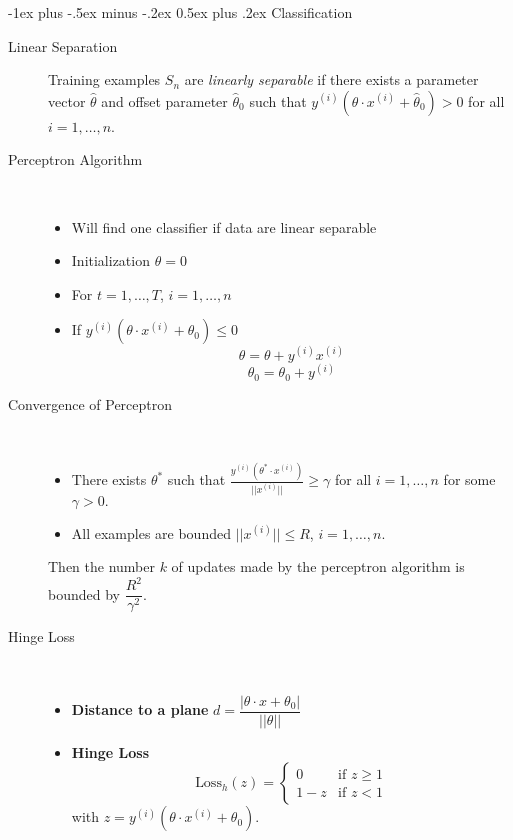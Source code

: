 \documentclass[a4paper, 10pt,landscape]{article}
\makeatletter
\renewcommand{\section}{\@startsection{section}{1}{0mm}%
                                {-1ex plus -.5ex minus -.2ex}%
                                {0.5ex plus .2ex}%
                                {\normalfont\large\bfseries}}
\makeatother
\begin{document}
\raggedright
\footnotesize
\begin{multicols*}{3}

\setlength{\premulticols}{1pt}
\setlength{\postmulticols}{1pt}
\setlength{\multicolsep}{1pt}
\setlength{\columnsep}{2pt}


\section{Classification}
\begin{description}
	\item[Linear Separation] Training examples $S_n$ are {\it linearly separable} if there exists a parameter vector $\widehat{\theta}$ and offset parameter $\widehat{\theta}_0$ such that $y^{(i)}\left(\widehat{\theta}\cdot x^{(i)}+\widehat{\theta}_0\right)>0$ for all $i=1,\dots,n$.
	\item[Perceptron Algorithm]~
		\begin{itemize}
			\item Will find one classifier if data are linear separable
			\item {Initialization} $\theta = 0$
			\item   For  {$t=1,\dots,T$}, {$i=1,\dots,n$}
			\item If {$y^{(i)}\left(\theta\cdot x^{(i)}+\theta_0\right)\leq0$}
					$$\theta=\theta+y^{(i)}x^{(i)}$$
					$$\theta_0=\theta_0+y^{(i)}$$
		\end{itemize}
	\item[Convergence of Perceptron]~
		\begin{itemize}
			\item There exists $\theta^*$ such that $\frac{y^{(i)}\left(\theta^*\cdot x^{(i)}\right)}{||{x^{(i)}}||}\geq\gamma$ for all $i=1,\dots,n$ for some $\gamma>0.$
			\item All examples are bounded $||{x^{(i)}}||\leq R$, $i=1,\dots,n.$
		\end{itemize}
		Then the number $k$ of updates made by the perceptron algorithm is bounded by $\dfrac{R^2}{\gamma^2}.$

	\item[Hinge Loss]~
			\begin{itemize}
			\item[] {\bf Distance to a plane} $d = \dfrac{|\theta \cdot x + \theta_0|}{||\theta||}$
			\item[] {\bf Hinge Loss} 
				$$\text{Loss}_h\left(z\right)=\begin{cases}
				0&\text{if }z\geq1\\
				1-z&\text{if }z<1
				\end{cases}$$
				with $z=y^{(i)}\left(\theta\cdot x^{(i)}+\theta_0\right)$.
				

\end{itemize}
\end{description}
\end{multicols*}
\end{document}
